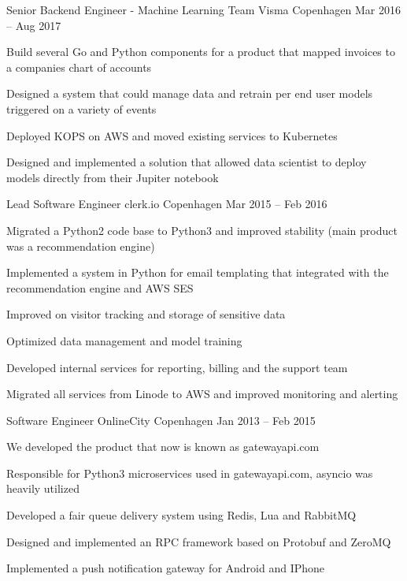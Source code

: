 \begin{cventries}
  \cventry
    {Senior Backend Engineer - Machine Learning Team} %
    {Visma} %
    {Copenhagen} %
    {Mar 2016 – Aug 2017} %
    {
      \begin{cvitems} %
        \item {Build several Go and Python components for a product that mapped invoices to a companies chart of accounts}
        \item {Designed a system that could manage data and retrain per end user models triggered on a variety of events}
        \item {Deployed KOPS on AWS and moved existing services to Kubernetes}
	\item {Designed and implemented a solution that allowed data scientist to deploy models directly from their Jupiter notebook}
      \end{cvitems}
    }

  \cventry
    {Lead Software Engineer} %
    {clerk.io} %
    {Copenhagen} %
    {Mar 2015 – Feb 2016} %
    {
      \begin{cvitems} %
        \item {Migrated a Python2 code base to Python3 and improved stability (main product was a recommendation engine)}
	\item {Implemented a system in Python for email templating that integrated with the recommendation engine and AWS SES}
	\item {Improved on visitor tracking and storage of sensitive data}
	\item {Optimized data management and model training}
        \item {Developed internal services for reporting, billing and the support team}
        \item {Migrated all services from Linode to AWS and improved monitoring and alerting}
      \end{cvitems}
    }

  \cventry
    {Software Engineer} %
    {OnlineCity} %
    {Copenhagen} %
    {Jan 2013 – Feb 2015} %
    {
      We developed the product that now is known as gatewayapi.com
      \vspace{5mm}
      \begin{cvitems} %
        \item {Responsible for Python3 microservices used in gatewayapi.com, asyncio was heavily utilized}
	\item {Developed a fair queue delivery system using Redis, Lua and RabbitMQ}
        \item {Designed and implemented an RPC framework based on Protobuf and ZeroMQ}
        \item {Implemented a push notification gateway for Android and IPhone}
      \end{cvitems}
    }


\end{cventries}
